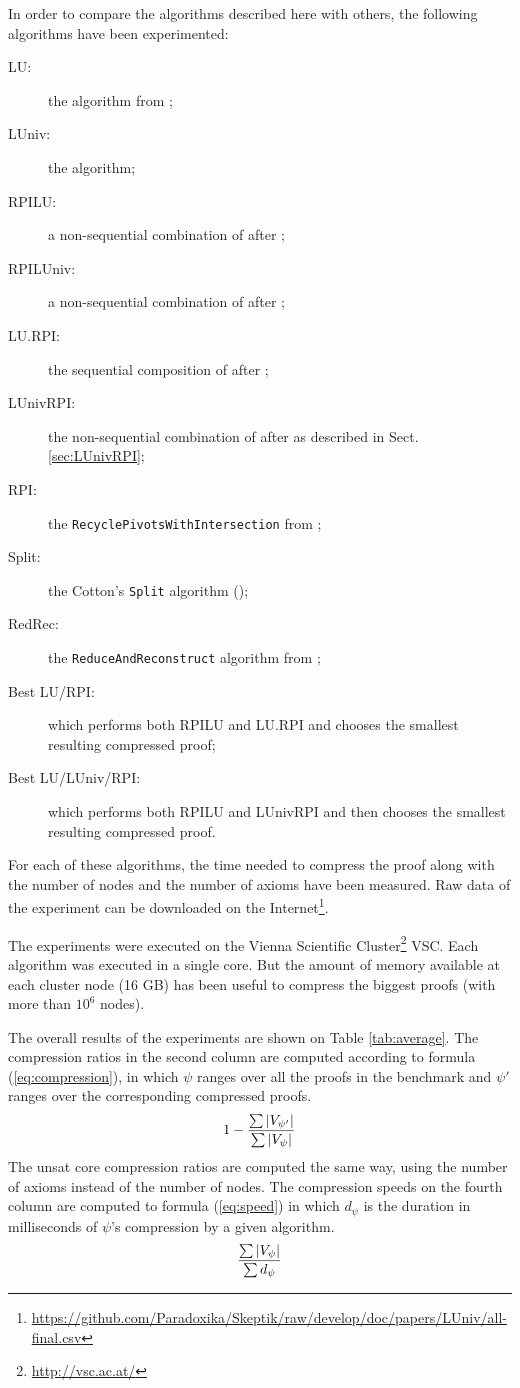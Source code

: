\documentclass{llncs}
\begin{document}
In order to compare the algorithms described here with others, the following algorithms have been experimented:
\begin{description}
  \item[LU:] the {\LowerUnits} algorithm from \cite{LURPI};
  \item[LUniv:] the {\LowerUnivalents} algorithm;
  \item[RPILU:] a non-sequential combination of {\RPI} after {\LowerUnits};
  \item[RPILUniv:] a non-sequential combination of {\RPI} after {\LowerUnivalents};
  \item[LU.RPI:] the sequential composition of {\LowerUnits} after {\RPI};
  \item[LUnivRPI:] the non-sequential combination of {\LowerUnivalents} after {\RPI} as described in Sect. \ref{sec:LUnivRPI};
  \item[RPI:] the \texttt{RecyclePivotsWithIntersection} from \cite{LURPI};
  \item[Split:] the Cotton's \texttt{Split} algorithm (\cite{CottonSplit});
  \item[RedRec:] the \texttt{ReduceAndReconstruct} algorithm from \cite{RedRec};
  \item[Best LU/RPI:] which performs both RPILU and LU.RPI and chooses the smallest resulting compressed proof;
  \item[Best LU/LUniv/RPI:] which performs both RPILU and LUnivRPI and then chooses the smallest resulting
    compressed proof.
\end{description}

For each of these algorithms, the time needed to compress the proof along with the number of nodes
and the number of axioms have been measured. Raw data of the experiment can be downloaded on the
Internet\footnote{\url{https://github.com/Paradoxika/Skeptik/raw/develop/doc/papers/LUniv/all-final.csv}}.

The experiments were executed on the Vienna Scientific Cluster\footnote{\url{http://vsc.ac.at/}}
VSC. Each algorithm was executed in a single core. But the amount of memory available
at each cluster node (16 GB) has been useful to compress the biggest proofs (with more than $10^6$
nodes).


The overall results of the experiments are shown on Table \ref{tab:average}. The compression ratios
in the second column are computed according to formula (\ref{eq:compression}), in which $\psi$
ranges over all the proofs in the benchmark and $\psi'$ ranges over the corresponding compressed
proofs.
\begin{equation} \label{eq:compression}
  1 - \frac{ \sum {|V_{\psi'}|} }{ \sum {|V_{\psi}|} }
\end{equation}
The unsat core compression ratios are computed the same way, using the number of axioms instead of
the number of nodes. The compression speeds on the fourth column are computed to formula
(\ref{eq:speed}) in which $d_{\psi}$ is the duration in milliseconds of $\psi$'s compression by a
given algorithm.
\begin{equation} \label{eq:speed}
  \frac{ \sum {|V_{\psi}|} }{ \sum {d_{\psi}} }
\end{equation}
\end{document}
